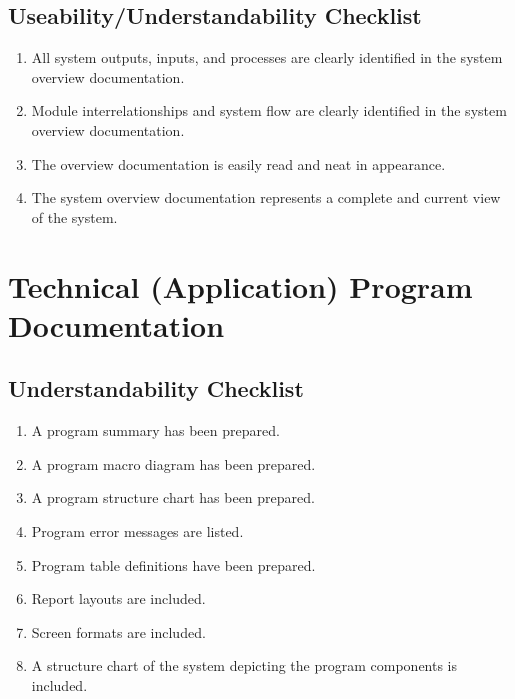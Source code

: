  \section {Useability/Understandability Checklist}
 \begin{enumerate}
  \item All system outputs, inputs, and processes are clearly identified
    in the system overview documentation.
  \item Module interrelationships and system flow are clearly identified
    in the system overview documentation.
  \item The overview documentation is easily read and neat in appearance.
  \item The system overview documentation represents a complete and
    current view of the system.
 \end{enumerate}
\chapter{Technical (Application) Program Documentation}
 \section {Understandability Checklist}
 \begin{enumerate}
  \item A program summary has been prepared.
  \item A program macro diagram has been prepared.
  \item A program structure chart has been prepared.
  \item Program error messages are listed.
  \item Program table definitions have been prepared.
  \item Report layouts are included.
  \item Screen formats are included.
  \item A structure chart of the system depicting the program
    components is included.
 \end{enumerate}
